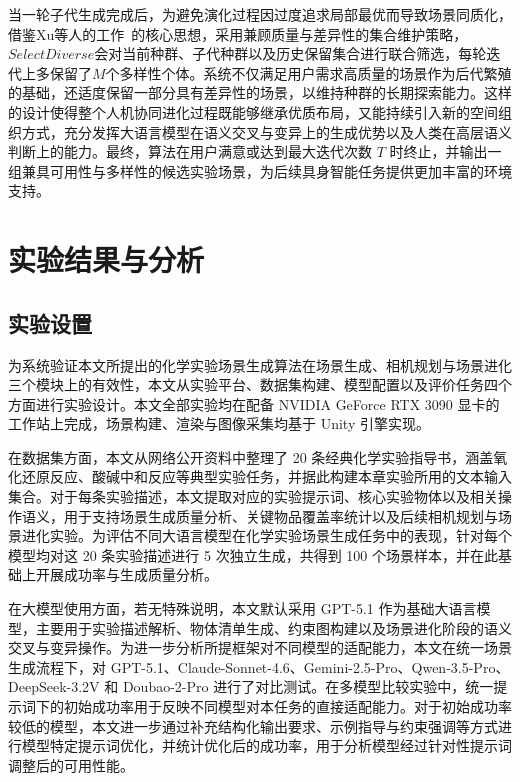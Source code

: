 当一轮子代生成完成后，为避免演化过程因过度追求局部最优而导致场景同质化，借鉴Xu等人的工作~\cite{xu2012fitdiverse}的核心思想，采用兼顾质量与差异性的集合维护策略，$SelectDiverse$会对当前种群、子代种群以及历史保留集合进行联合筛选，每轮迭代上多保留了$M$个多样性个体。系统不仅满足用户需求高质量的场景作为后代繁殖的基础，还适度保留一部分具有差异性的场景，以维持种群的长期探索能力。这样的设计使得整个人机协同进化过程既能够继承优质布局，又能持续引入新的空间组织方式，充分发挥大语言模型在语义交叉与变异上的生成优势以及人类在高层语义判断上的能力。最终，算法在用户满意或达到最大迭代次数 $T$ 时终止，并输出一组兼具可用性与多样性的候选实验场景，为后续具身智能任务提供更加丰富的环境支持。


\section{实验结果与分析}

\subsection{实验设置}
为系统验证本文所提出的化学实验场景生成算法在场景生成、相机规划与场景进化三个模块上的有效性，本文从实验平台、数据集构建、模型配置以及评价任务四个方面进行实验设计。本文全部实验均在配备 NVIDIA GeForce RTX 3090 显卡的工作站上完成，场景构建、渲染与图像采集均基于 Unity 引擎实现。

在数据集方面，本文从网络公开资料中整理了 20 条经典化学实验指导书，涵盖氧化还原反应、酸碱中和反应等典型实验任务，并据此构建本章实验所用的文本输入集合。对于每条实验描述，本文提取对应的实验提示词、核心实验物体以及相关操作语义，用于支持场景生成质量分析、关键物品覆盖率统计以及后续相机规划与场景进化实验。为评估不同大语言模型在化学实验场景生成任务中的表现，针对每个模型均对这 20 条实验描述进行 5 次独立生成，共得到 100 个场景样本，并在此基础上开展成功率与生成质量分析。

在大模型使用方面，若无特殊说明，本文默认采用 GPT-5.1 作为基础大语言模型，主要用于实验描述解析、物体清单生成、约束图构建以及场景进化阶段的语义交叉与变异操作。为进一步分析所提框架对不同模型的适配能力，本文在统一场景生成流程下，对 GPT-5.1、Claude-Sonnet-4.6、Gemini-2.5-Pro、Qwen-3.5-Pro、DeepSeek-3.2V 和 Doubao-2-Pro 进行了对比测试。在多模型比较实验中，统一提示词下的初始成功率用于反映不同模型对本任务的直接适配能力。对于初始成功率较低的模型，本文进一步通过补充结构化输出要求、示例指导与约束强调等方式进行模型特定提示词优化，并统计优化后的成功率，用于分析模型经过针对性提示词调整后的可用性能。

